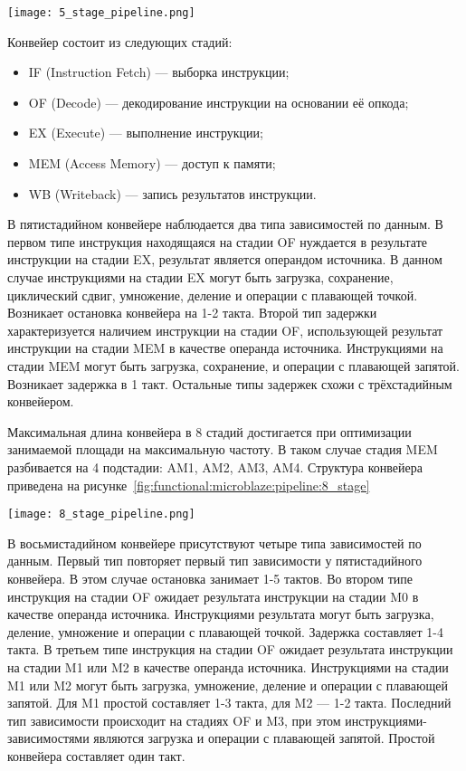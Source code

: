 \begin{center}
  \centering
  \texttt{[image: 5\_stage\_pipeline.png]}
  \label{fig:functional:microblaze:pipeline:5_stage}
\end{center}

Конвейер состоит из следующих стадий:
\begin{itemize}
  \item IF (Instruction Fetch) --- выборка инструкции;
  \item OF (Decode) --- декодирование инструкции на основании её опкода;
  \item EX (Execute) --- выполнение инструкции;
  \item MEM (Access Memory) --- доступ к памяти;
  \item WB (Writeback) --- запись результатов инструкции.
\end{itemize}


В пятистадийном конвейере наблюдается два типа зависимостей по данным. В первом типе
инструкция находящаяся на стадии OF нуждается в результате инструкции на стадии EX,
результат является операндом источника. В данном случае инструкциями на стадии EX
могут быть загрузка, сохранение, циклический сдвиг, умножение, деление и операции
с плавающей точкой. Возникает остановка конвейера на 1-2 такта.
Второй тип задержки характеризуется наличием инструкции на стадии OF, использующей
результат инструкции на стадии MEM в качестве операнда источника. Инструкциями на стадии
MEM могут быть загрузка, сохранение, и операции с плавающей запятой. Возникает задержка
в 1 такт. Остальные типы задержек схожи с трёхстадийным конвейером.

Максимальная длина конвейера в 8 стадий достигается при оптимизации занимаемой площади
на максимальную частоту. В таком случае стадия MEM разбивается на 4 подстадии: AM1,
AM2, AM3, AM4.
Структура конвейера приведена на рисунке~\ref{fig:functional:microblaze:pipeline:8_stage}

\begin{center}
  \centering
  \texttt{[image: 8\_stage\_pipeline.png]}
  \label{fig:functional:microblaze:pipeline:8_stage}
\end{center}

В восьмистадийном конвейере присутствуют четыре типа зависимостей по данным.
Первый тип повторяет первый тип зависимости у пятистадийного конвейера. В
этом случае остановка занимает 1-5 тактов. Во втором типе инструкция на стадии
OF ожидает результата инструкции на стадии M0 в качестве операнда источника.
Инструкциями результата могут быть загрузка, деление, умножение и операции с
плавающей точкой. Задержка составляет 1-4 такта. В третьем типе инструкция
на стадии OF ожидает результата инструкции на стадии M1 или M2 в качестве
операнда источника. Инструкциями на стадии M1 или M2 могут быть загрузка,
умножение, деление и операции с плавающей запятой. Для M1 простой составляет
1-3 такта, для M2 --- 1-2 такта. Последний тип зависимости происходит на стадиях
OF и M3, при этом инструкциями-зависимостями являются загрузка и операции с
плавающей запятой. Простой конвейера составляет один такт.

